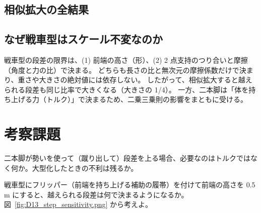 \subsection{相似拡大の全結果}


\subsection{なぜ戦車型はスケール不変なのか}

戦車型の段差の限界は、(1) 前端の高さ（形）、(2) 2 点支持のつり合いと摩擦（角度と力の比）で決まる。
どちらも長さの比と無次元の摩擦係数だけで決まり、重さや大きさの絶対値には依存しない。
したがって、相似拡大すると越えられる段差も同じ比率で大きくなる（大きさの 1/4）。
一方、二本脚は「体を持ち上げる力（トルク）」で決まるため、二乗三乗則の影響をまともに受ける。

\section*{考察課題}
\begin{exercise}
二本脚が勢いを使って（蹴り出して）段差を上る場合、必要なのはトルクではなく何か。大型化したときの不利は残るか。
\end{exercise}
\begin{exercise}
戦車型にフリッパー（前端を持ち上げる補助の履帯）を付けて前端の高さを 0.5 m にすると、越えられる段差は何で決まるようになるか。図~\ref{fig:D13_step_sensitivity.png} から考えよ。
\end{exercise}
